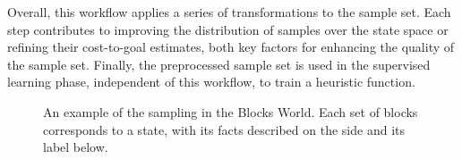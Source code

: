 Overall, this workflow applies a series of transformations to the sample set. Each step contributes to improving the distribution of samples over the state space or refining their cost-to-goal estimates, both key factors for enhancing the quality of the sample set. Finally, the preprocessed sample set is used in the supervised learning phase, independent of this workflow, to train a heuristic function.


\begin{figure}[ht]
    \caption[An example of the sampling in the Blocks World.]{An example of the sampling in the Blocks World. Each set of blocks corresponds to a state, with its facts described on the side and its label below.}
    \label{fig:example}
    \addvspace{\baselineskip}
    \centering
\end{figure}

